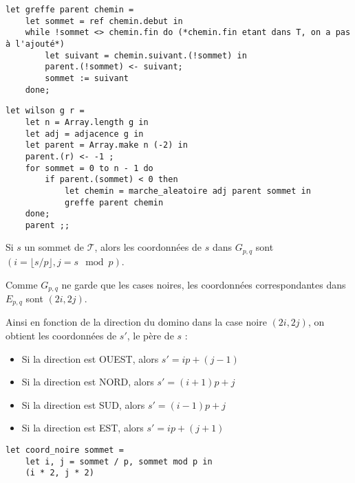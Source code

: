 \documentclass{article}
\newcommand{\image}[3]{
    \begin{minipage}[t]{\linewidth}
        #1
        \adjustbox{valign=t}{
            \texttt{[image: \#3]}
        }
    \end{minipage}}
\begin{document}
\begin{question}
    \item \begin{verbatim}
let greffe parent chemin =
    let sommet = ref chemin.debut in
    while !sommet <> chemin.fin do (*chemin.fin etant dans T, on a pas à l'ajouté*)
        let suivant = chemin.suivant.(!sommet) in
        parent.(!sommet) <- suivant;
        sommet := suivant
    done;
    \end{verbatim}

    \item \begin{verbatim}
let wilson g r =
    let n = Array.length g in
    let adj = adjacence g in
    let parent = Array.make n (-2) in
    parent.(r) <- -1 ;
    for sommet = 0 to n - 1 do
        if parent.(sommet) < 0 then
            let chemin = marche_aleatoire adj parent sommet in
            greffe parent chemin
    done;
    parent ;;
    \end{verbatim}

    \item \image{\centering}{0.5}{q21}
    
    \item \image{\centering}{0.4}{q22}
    
    \item Si $s$ un sommet de $\mathcal{T}$, alors les coordonnées de $s$ 
    dans $G_{p, q}$ sont $(i = \lfloor s / p \rfloor, j = s \mod p)$. 

    Comme $G_{p, q}$ ne garde que les cases noires, les coordonnées 
    correspondantes dans $E_{p, q}$ sont $(2i, 2j)$. 
    
    Ainsi en fonction de la direction du domino dans la case noire $(2i, 2j)$,
    on obtient les coordonnées de $s'$, le père de $s$ :
    \begin{itemize}
        \item Si la direction est OUEST, alors $s' = ip + (j - 1)$
        \item Si la direction est NORD, alors $s' = (i + 1)p + j$
        \item Si la direction est SUD, alors $s' = (i- 1)p + j$
        \item Si la direction est EST, alors $s' = ip + (j + 1)$
    \end{itemize}

    \item \begin{verbatim}
let coord_noire sommet = 
    let i, j = sommet / p, sommet mod p in
    (i * 2, j * 2) 
    \end{verbatim}


\end{question}
\end{document}
